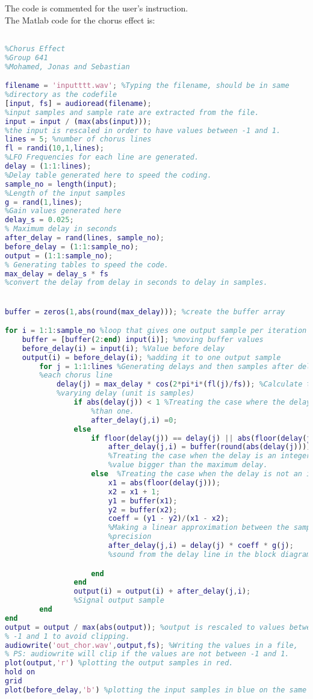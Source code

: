 The code is commented for the user's instruction.\\

The Matlab code for the chorus effect is:

\begin{lstlisting}[language=Matlab, caption= Matlab code for chorus effect]

%Chorus Effect
%Group 641
%Mohamed, Jonas and Sebastian

filename = 'inputttt.wav'; %Typing the filename, should be in same 
%directory as the codefile
[input, fs] = audioread(filename);
%input samples and sample rate are extracted from the file.
input = input / (max(abs(input)));
%the input is rescaled in order to have values between -1 and 1.
lines = 5; %number of chorus lines 
fl = randi(10,1,lines);
%LFO Frequencies for each line are generated.
delay = (1:1:lines);
%Delay table generated here to speed the coding. 
sample_no = length(input); 
%Length of the input samples
g = rand(1,lines); 
%Gain values generated here
delay_s = 0.025; 
% Maximum delay in seconds 
after_delay = rand(lines, sample_no); 
before_delay = (1:1:sample_no);
output = (1:1:sample_no);
% Generating tables to speed the code. 
max_delay = delay_s * fs  
%convert the delay from delay in seconds to delay in samples. 


buffer = zeros(1,abs(round(max_delay))); %create the buffer array 

for i = 1:1:sample_no %loop that gives one output sample per iteration
	buffer = [buffer(2:end) input(i)]; %moving buffer values
	before_delay(i) = input(i); %Value before delay
	output(i) = before_delay(i); %adding it to one output sample
		for j = 1:1:lines %Generating delays and then samples after delay for 
		%each chorus line
			delay(j) = max_delay * cos(2*pi*i*(fl(j)/fs)); %Calculate time  
			%varying delay (unit is samples)
				if abs(delay(j)) < 1 %Treating the case where the delay is less 
					%than one.
					after_delay(j,i) =0;
				else
					if floor(delay(j)) == delay(j) || abs(floor(delay(j))) >= floor(max_delay)
						after_delay(j,i) = buffer(round(abs(delay(j)))) * g(j);
						%Treating the case when the delay is an integer and when it has a
						%value bigger than the maximum delay. 
					else  %Treating the case when the delay is not an integer
						x1 = abs(floor(delay(j)));
						x2 = x1 + 1;
						y1 = buffer(x1);
						y2 = buffer(x2);
						coeff = (y1 - y2)/(x1 - x2);
						%Making a linear approximation between the samples to increase
						%precision
						after_delay(j,i) = delay(j) * coeff * g(j);  
						%sound from the delay line in the block diagram

					end
				end
				output(i) = output(i) + after_delay(j,i);
				%Signal output sample
		end
end
output = output / max(abs(output)); %output is rescaled to values between
% -1 and 1 to avoid clipping. 
audiowrite('out_chor.wav',output,fs); %Writing the values in a file, 
% PS: audiowrite will clip if the values are not between -1 and 1.
plot(output,'r') %plotting the output samples in red.
hold on
grid
plot(before_delay,'b') %plotting the input samples in blue on the same fig.



\end{lstlisting}


